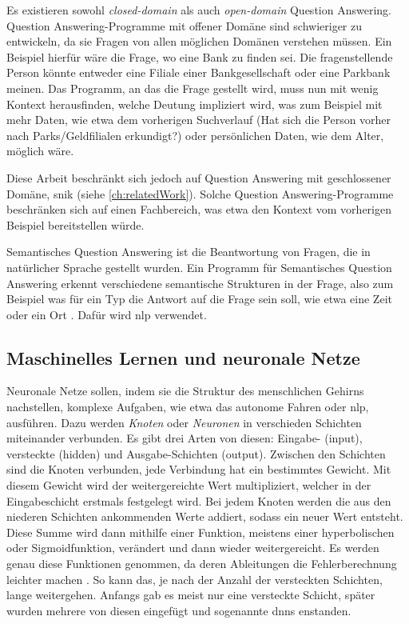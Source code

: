 Es existieren sowohl \emph{closed-domain} als auch \emph{open-domain} Question Answering.
Question Answering-Programme mit offener Domäne sind schwieriger zu entwickeln,
da sie Fragen von allen möglichen Domänen verstehen müssen.
Ein Beispiel hierfür wäre die Frage, wo eine Bank zu finden sei.
Die fragenstellende Person könnte entweder eine Filiale einer Bankgesellschaft oder eine Parkbank meinen.
Das Programm, an das die Frage gestellt wird, muss nun mit wenig Kontext herausfinden,
welche Deutung impliziert wird, was zum Beispiel mit mehr Daten,
wie etwa dem vorherigen Suchverlauf (Hat sich die Person vorher nach Parks/Geldfilialen erkundigt?)
oder persönlichen Daten, wie dem Alter, möglich wäre.

Diese Arbeit beschränkt sich jedoch auf Question Answering mit geschlossener Domäne, \ac{snik} (siehe \cref{ch:relatedWork}).
Solche Question Answering-Programme beschränken sich auf einen Fachbereich,
was etwa den Kontext vom vorherigen Beispiel bereitstellen würde.

\begin{definition}
Semantisches Question Answering ist die Beantwortung von Fragen, die in natürlicher Sprache gestellt wurden.
Ein Programm für Semantisches Question Answering erkennt verschiedene semantische Strukturen in der Frage,
also zum Beispiel was für ein Typ die Antwort auf die Frage sein soll, wie etwa eine Zeit oder ein Ort \citep{sqadefinition}.
Dafür wird \acs{nlp} verwendet.
\end{definition}

\subsection{Maschinelles Lernen und neuronale Netze}

Neuronale Netze sollen, indem sie die Struktur des menschlichen Gehirns nachstellen, komplexe Aufgaben, wie etwa das autonome Fahren oder \ac{nlp}, ausführen.
Dazu werden \emph{Knoten} oder \emph{Neuronen} in verschieden Schichten miteinander verbunden.
Es gibt drei Arten von diesen: Eingabe- (input), versteckte (hidden) und Ausgabe-Schichten (output).
Zwischen den Schichten sind die Knoten verbunden, jede Verbindung hat ein bestimmtes Gewicht.
Mit diesem Gewicht wird der weitergereichte Wert multipliziert, welcher in der Eingabeschicht erstmals festgelegt wird.
Bei jedem Knoten werden die aus den niederen Schichten ankommenden Werte addiert, sodass ein neuer Wert entsteht.
Diese Summe wird dann mithilfe einer Funktion, meistens einer hyperbolischen oder Sigmoidfunktion, verändert und dann wieder weitergereicht.
Es werden genau diese Funktionen genommen, da deren Ableitungen die Fehlerberechnung leichter machen \citep{deeplearningarchitecturesreview}.
So kann das, je nach der Anzahl der versteckten Schichten, lange weitergehen.
Anfangs gab es meist nur eine versteckte Schicht, später wurden mehrere von diesen eingefügt und sogenannte \aclp{dnn} enstanden.


